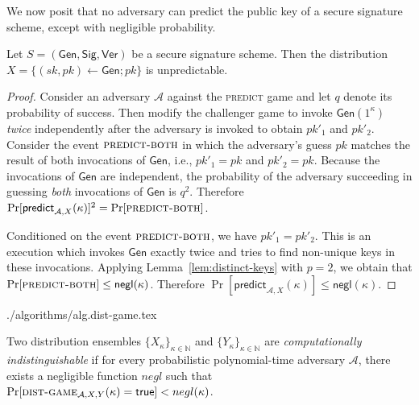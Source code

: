 We now posit that no adversary can predict the public key of a secure signature scheme, except with negligible probability.

\begin{lemma}\label{lem:pk-unpredictability}
  Let $S = (\textsf{Gen}, \textsf{Sig}, \textsf{Ver})$ be a secure signature scheme.
  Then the distribution $X = \{(sk, pk) \gets \textsf{Gen}; pk\}$ is
  unpredictable.
\end{lemma}
\begin{proof}
  Consider an adversary $\mathcal{A}$ against the \textsc{predict} game and let $q$ denote its probability of success. Then modify the challenger game to invoke $\textsf{Gen}(1^\kappa)$ \emph{twice} independently after the adversary is invoked to obtain $pk'_1$ and $pk'_2$. Consider the event $\textsc{predict-both}$ in which the adversary's guess $pk$ matches the result of both invocations of $\textsf{Gen}$, i.e., $pk'_1 = pk$ and $pk'_2 = pk$.
  Because the invocations of $\textsf{Gen}$ are independent, the probability of the adversary succeeding in guessing \emph{both} invocations of $\textsf{Gen}$ is $q^2$. Therefore
  $
  \Pr[\textsf{predict}_{\mathcal{A},X}(\kappa)]^2 = \Pr[\textsc{predict-both}]
  $.

  Conditioned on the event $\textsc{predict-both}$, we have $pk'_1 = pk'_2$. This is an execution which invokes $\textsf{Gen}$ exactly twice and tries to find non-unique keys in these invocations. Applying Lemma~\ref{lem:distinct-keys} with $p = 2$, we obtain that
  $
  \Pr[\textsc{predict-both}] \leq \textsf{negl}(\kappa)
  $.
  Therefore
  $
  \Pr[\textsf{predict}_{\mathcal{A},X}(\kappa)] \leq \textsf{negl}(\kappa)
  $.
\end{proof}

{./algorithms/alg.dist-game.tex}

\begin{definition}
  Two distribution ensembles $\{X_\kappa\}_{\kappa\in\mathbb{N}}$ and $\{Y_\kappa\}_{\kappa\in\mathbb{N}}$ are
  \emph{computationally indistinguishable}
  if for every probabilistic polynomial-time adversary $\mathcal{A}$,
  there exists a negligible function $negl$ such that
  $\Pr[\textsc{dist-game}_{\mathcal{A},X,Y}(\kappa) = \mathsf{true}] < negl(\kappa)$.
\end{definition}

